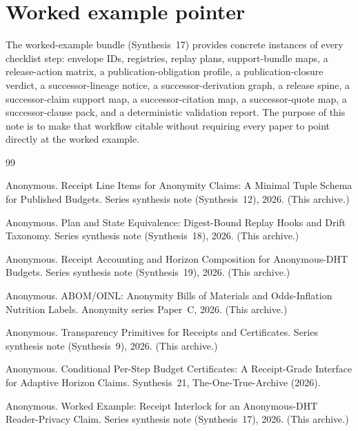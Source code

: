 \documentclass[11pt]{article}
\begin{document}
\section{Worked example pointer}
The worked-example bundle (Synthesis~17) provides concrete instances of every checklist step: envelope IDs, registries, replay plans, support-bundle maps, a release-action matrix, a publication-obligation profile, a publication-closure verdict, a successor-lineage notice, a successor-derivation graph, a release spine, a successor-claim support map, a successor-citation map, a successor-quote map, a successor-clause pack, and a deterministic validation report.\cite{series:workedexample}
The purpose of this note is to make that workflow citable without requiring every paper to point directly at the worked example.

\begin{thebibliography}{99}\small

Anonymous.
\newblock Receipt Line Items for Anonymity Claims: A Minimal Tuple Schema for Published Budgets.
\newblock Series synthesis note (Synthesis~12), 2026. (This archive.)

Anonymous.
\newblock Plan and State Equivalence: Digest-Bound Replay Hooks and Drift Taxonomy.
\newblock Series synthesis note (Synthesis~18), 2026. (This archive.)

Anonymous.
\newblock Receipt Accounting and Horizon Composition for Anonymous-DHT Budgets.
\newblock Series synthesis note (Synthesis~19), 2026. (This archive.)

Anonymous.
\newblock ABOM/OINL: Anonymity Bills of Materials and Odds-Inflation Nutrition Labels.
\newblock Anonymity series Paper~C, 2026. (This archive.)

Anonymous.
\newblock Transparency Primitives for Receipts and Certificates.
\newblock Series synthesis note (Synthesis~9), 2026. (This archive.)

Anonymous.
\newblock Conditional Per-Step Budget Certificates: A Receipt-Grade Interface for Adaptive Horizon Claims.
\newblock Synthesis~21, The-One-True-Archive (2026).

Anonymous.
\newblock Worked Example: Receipt Interlock for an Anonymous-DHT Reader-Privacy Claim.
\newblock Series synthesis note (Synthesis~17), 2026. (This archive.)


\end{thebibliography}
\end{document}
